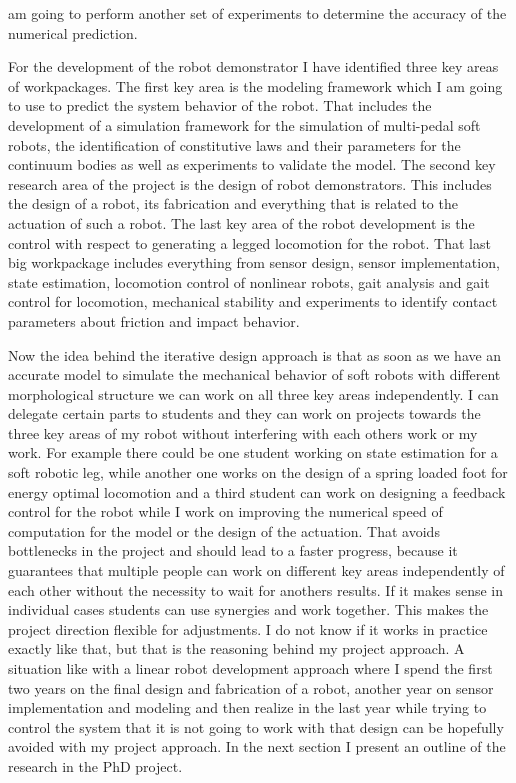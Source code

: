 am going to perform another set of experiments to determine the accuracy of the numerical prediction. \par
%
For the development of the robot demonstrator I have identified three key areas of workpackages. The first key area is the modeling framework which I am going
 to use to predict the system behavior of the robot. That includes the development of a simulation framework for the simulation of multi-pedal soft robots, 
 the identification of constitutive laws and their parameters for the continuum bodies as well as experiments to validate the model.
% 
The second key research area of the project is the design of robot demonstrators. This
includes the design of a robot, its fabrication and everything that is related to the actuation of such a robot. 
%
The last key area of the robot development is the control with respect to generating a legged locomotion for the robot. That last big workpackage includes everything from
 sensor design, sensor implementation, state estimation, locomotion control of nonlinear robots,
gait analysis and gait control for locomotion, mechanical stability and experiments to identify contact parameters about friction and impact behavior. 
%
\par
Now the idea behind the iterative design approach is that as soon as we have an accurate model to simulate the mechanical behavior of soft robots with different morphological structure
we can work on all three key areas independently. I can delegate certain parts to students and they can work on projects towards the three key areas of my robot without
interfering with each others work or my work.
%
For example there could be one student working on state estimation for a soft robotic leg, while another one works on the design of a spring loaded foot for energy optimal
 locomotion and a third student can work on designing a feedback control for the robot while I work on improving the numerical speed of computation for the model or the design of 
 the actuation.
%
That avoids bottlenecks in the project and should lead to a faster progress, because it guarantees that multiple people can work on different key areas independently of each other without the
 necessity to wait for anothers results. If it makes sense in individual cases students can use synergies and work together. This makes the project direction flexible for adjustments. I do not know if
  it works in practice exactly like that, but that is the reasoning behind my project approach.
%
A situation like with a linear robot development approach where I spend the first two years on the final design and fabrication of a robot, another year on sensor implementation
 and modeling and then realize in the last year while trying to control the system that it is not going to work with that design can be hopefully avoided with my project approach.
%
%
In the next section I present an outline of the research in the PhD project.
%

